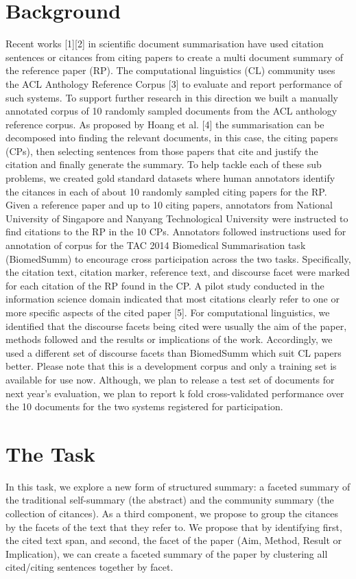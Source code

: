 \documentclass[11pt]{article}
\begin{document}
\section{Background}
Recent works [1][2] in scientific document summarisation have used citation sentences or citances from citing papers to create a multi document summary of the reference paper (RP). The computational linguistics (CL) community uses the ACL Anthology Reference Corpus [3] to evaluate and report performance of such systems. To support further research in this direction we built a manually annotated corpus of 10 randomly sampled documents from the ACL anthology reference corpus.
As proposed by Hoang et al. [4] the summarisation can be decomposed into finding the relevant documents, in this case, the citing papers (CPs), then selecting sentences from those papers that cite and justify the citation and finally generate the summary. To help tackle each of these sub problems, we created gold standard datasets where human annotators identify the citances in each of about 10 randomly sampled citing papers for the RP.
Given a reference paper and up to 10 citing papers, annotators from National University of Singapore and Nanyang Technological University were instructed to find citations to the RP in the 10 CPs. Annotators followed instructions used for annotation of corpus for the TAC 2014 Biomedical Summarisation task (BiomedSumm) to encourage cross participation across the two tasks. Specifically, the citation text, citation marker, reference text, and discourse facet were marked for each citation of the RP found in the CP. 
A pilot study conducted in the information science domain indicated that most citations clearly refer to one or more specific aspects of the cited paper [5]. For computational linguistics, we identified that the discourse facets being cited were usually the aim of the paper, methods followed and the results or implications of the work. Accordingly, we used a different set of discourse facets than BiomedSumm which suit CL papers better. 
Please note that this is a development corpus and only a training set is available for use now. Although, we plan to release a test set of documents for next year’s evaluation, we plan to report k fold cross-validated performance over the 10 documents for the two systems registered for participation. 

\section{The Task}
In this task, we explore a new form of structured summary: a faceted summary of the traditional
self-summary (the abstract) and the community summary (the collection of citances).  As a third component, we propose to group the citances by the facets of the text that they refer to. We propose that by identifying first, the cited text span, and second, the facet of the paper (Aim, Method, Result or Implication), we can create a faceted summary of the paper by clustering all cited/citing sentences together by facet.
\end{document}
